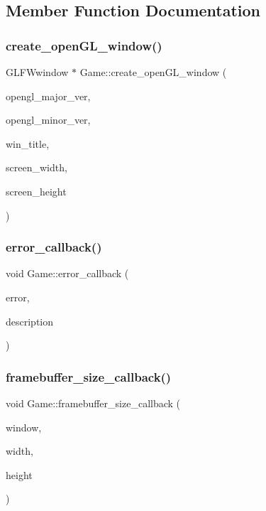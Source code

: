 \subsection{Member Function Documentation}
\mbox{\label{classGame_ad25806b818108918a7e5fc5bd71f5de3}} 
\subsubsection{\texorpdfstring{create\+\_\+open\+G\+L\+\_\+window()}{create\_openGL\_window()}}
{\footnotesize\ttfamily G\+L\+F\+Wwindow $\ast$ Game\+::create\+\_\+open\+G\+L\+\_\+window (\begin{DoxyParamCaption}\item[{int}]{opengl\+\_\+major\+\_\+ver,  }\item[{int}]{opengl\+\_\+minor\+\_\+ver,  }\item[{const char $\ast$}]{win\+\_\+title,  }\item[{int}]{screen\+\_\+width,  }\item[{int}]{screen\+\_\+height }\end{DoxyParamCaption})}

\mbox{\label{classGame_a78d191af16100cc28477474bc0b1e2de}} 
\subsubsection{\texorpdfstring{error\+\_\+callback()}{error\_callback()}}
{\footnotesize\ttfamily void Game\+::error\+\_\+callback (\begin{DoxyParamCaption}\item[{int}]{error,  }\item[{const char $\ast$}]{description }\end{DoxyParamCaption})}

\mbox{\label{classGame_add1087a248a7e136debe003af25f9fa2}} 
\subsubsection{\texorpdfstring{framebuffer\+\_\+size\+\_\+callback()}{framebuffer\_size\_callback()}}
{\footnotesize\ttfamily void Game\+::framebuffer\+\_\+size\+\_\+callback (\begin{DoxyParamCaption}\item[{G\+L\+F\+Wwindow $\ast$}]{window,  }\item[{int}]{width,  }\item[{int}]{height }\end{DoxyParamCaption})}

